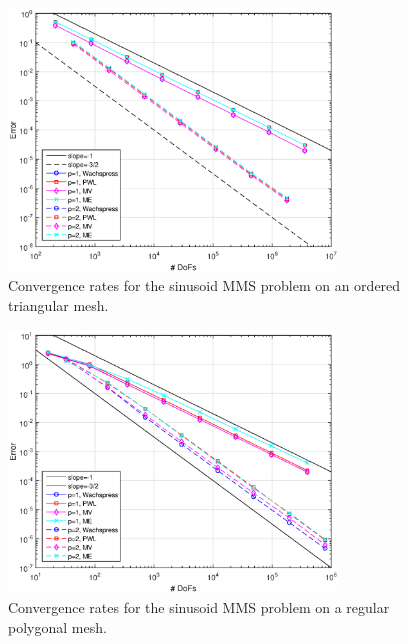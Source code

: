 \begin{figure}
\centering
\includegraphics[width=0.775\textwidth]{figures/sec_BF/TransMMS_Sine_tri_err.eps}
\caption{Convergence rates for the sinusoid MMS problem on an ordered triangular mesh.}
\label{fig::BF_Results_MMS_Sine_tri}
\end{figure}

\begin{figure}
\centering
\includegraphics[width=0.775\textwidth]{figures/sec_BF/TransMMS_Sine_poly_err.eps}
\caption{Convergence rates for the sinusoid MMS problem on a regular polygonal mesh.}
\label{fig::BF_Results_MMS_Sine_poly}
\end{figure}

